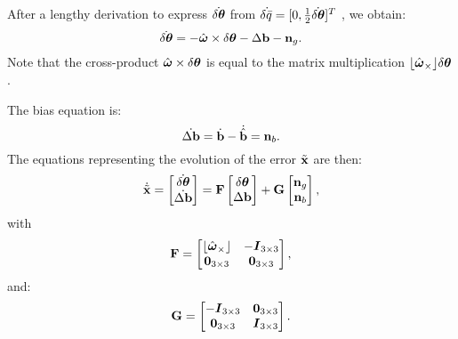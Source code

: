 
After a lengthy derivation to express $\dot{\delta\boldsymbol\theta}$ from $\dot{\delta\bar{q}} = [0, \frac{1}{2}\dot{\delta\boldsymbol\theta}]^T$ \citep{Trawny:2005va}, we obtain:
\begin{equation}
\dot{\delta\boldsymbol\theta} = -\hat{\boldsymbol\omega}\times\delta\boldsymbol\theta - \Delta\textrm{\textbf{b}} - \textbf{n}_g.
\end{equation}
Note that the cross-product $\hat{\boldsymbol\omega}\times\delta\boldsymbol\theta$ is equal to the matrix multiplication $\lfloor \hat{\boldsymbol\omega}_\times \rfloor\delta\boldsymbol\theta$.

The bias equation is: 
\begin{equation}
\dot{\Delta\textrm{\textbf{b}}} = \dot{\textrm{\textbf{b}}} - \dot{\hat{\textrm{\textbf{b}}}} = \textbf{n}_b.
\end{equation}
The equations representing the evolution of the error $\tilde{\textrm{\textbf{x}}}$ are then:
\begin{equation}
\dot{\tilde{\textrm{\textbf{x}}}} = \begin{bmatrix} \dot{\delta\boldsymbol\theta} \\ \dot{\Delta\textrm{\textbf{b}}} \end{bmatrix} = \textrm{\textbf{F}} \begin{bmatrix} \delta\boldsymbol\theta \\ \Delta\textrm{\textbf{b}}\end{bmatrix} + \textrm{\textbf{G}} \begin{bmatrix} \textbf{n}_g \\ \textbf{n}_b \end{bmatrix},
\end{equation}
with
\begin{equation}
\textrm{\textbf{F}} = \begin{bmatrix} \lfloor \hat{\boldsymbol\omega}_\times \rfloor & -\boldsymbol{I}_{3\times 3} \\ \boldsymbol{0}_{3\times 3} & \boldsymbol{0}_{3\times 3} \end{bmatrix},
\end{equation}
and:
\begin{equation}
\textrm{\textbf{G}} = \begin{bmatrix} -\boldsymbol{I}_{3\times 3} & \boldsymbol{0}_{3\times 3} \\ \boldsymbol{0}_{3\times 3} & \boldsymbol{I}_{3\times 3} \end{bmatrix}.
\end{equation}

